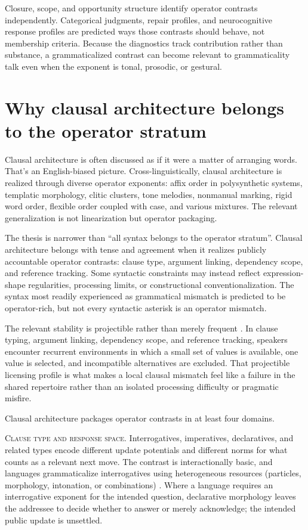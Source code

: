 \documentclass[12pt,letterpaper]{article}
\begin{document}
Closure, scope, and opportunity structure identify operator contrasts independently. Categorical judgments, repair profiles, and neurocognitive response profiles are predicted ways those contrasts should behave, not membership criteria. Because the diagnostics track contribution rather than substance, a grammaticalized contrast can become relevant to grammaticality talk even when the exponent is tonal, prosodic, or gestural.

\section{Why clausal architecture belongs to the operator stratum}

Clausal architecture is often discussed as if it were a matter of arranging words. That's an English-biased picture. Cross-linguistically, clausal architecture is realized through diverse operator exponents: affix order in polysynthetic systems, templatic morphology, clitic clusters, tone melodies, nonmanual marking, rigid word order, flexible order coupled with case, and various mixtures. The relevant generalization is not linearization but operator packaging.

The thesis is narrower than \enquote{all syntax belongs to the operator stratum}. Clausal architecture belongs with tense and agreement when it realizes publicly accountable operator contrasts: clause type, argument linking, dependency scope, and reference tracking. Some syntactic constraints may instead reflect expression-shape regularities, processing limits, or constructional conventionalization. The syntax most readily experienced as grammatical mismatch is predicted to be operator-rich, but not every syntactic asterisk is an operator mismatch.

The relevant stability is projectible rather than merely frequent \citep{reynolds2026notEveryStableCluster}. In clause typing, argument linking, dependency scope, and reference tracking, speakers encounter recurrent environments in which a small set of values is available, one value is selected, and incompatible alternatives are excluded. That projectible licensing profile is what makes a local clausal mismatch feel like a failure in the shared repertoire rather than an isolated processing difficulty or pragmatic misfire.

Clausal architecture packages operator contrasts in at least four domains.

\textsc{Clause type and response space.} Interrogatives, imperatives, declaratives, and related types encode different update potentials and different norms for what counts as a relevant next move. The contrast is interactionally basic, and languages grammaticalize interrogatives using heterogeneous resources (particles, morphology, intonation, or combinations) \citep{dryer2013,ladd2008}. Where a language requires an interrogative exponent for the intended question, declarative morphology leaves the addressee to decide whether to answer or merely acknowledge; the intended public update is unsettled.
\end{document}
